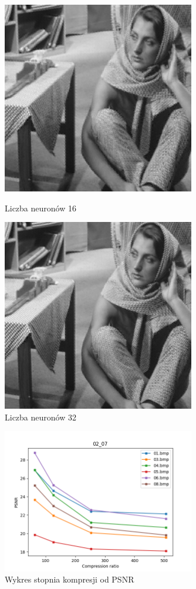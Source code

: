 \documentclass[../EDI_Task4_Karwowski_Kowalewski.tex]{subfiles}
\begin{document}
{    \begin{figure}[!htbp]
        \begin{minipage}[c]{0.49\linewidth}
            \centering
            \includegraphics[width=0.75\textwidth]{img/results_2/16/compressed_05.png}
            \caption{Liczba neuronów 16}
        \end{minipage}\hfill
        \begin{minipage}[c]{0.49\linewidth}
            \centering
            \includegraphics[width=0.75\textwidth]{img/results_2/32/compressed_05.png}
            \caption{Liczba neuronów 32}
        \end{minipage}
    \end{figure}

    \begin{figure}[!htbp]
        \centering
        \includegraphics[width=0.75\textwidth]{img/results_2/stats_02_07.png}
        \caption{Wykres stopnia kompresji od PSNR}
    \end{figure}
    \FloatBarrier
}
\end{document}

